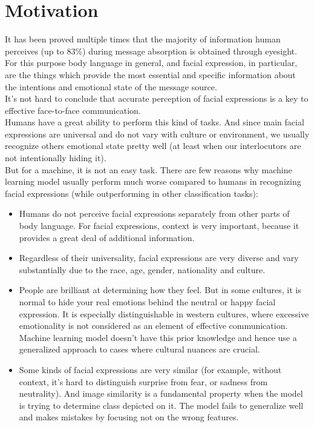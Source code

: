 \section{Motivation}

It has been proved multiple times that the majority of information human perceives (up to $83\%$) during message absorption is obtained through eyesight. For this purpose body language in general, and facial expression, in particular, are the things which provide the most essential and specific information about the intentions and emotional state of the message source.\\

It's not hard to conclude that accurate perception of facial expressions is a key to effective face-to-face communication.\\

Humans have a great ability to perform this kind of tasks. And since main facial expressions are universal and do not vary with culture or environment, we usually recognize others emotional state pretty well (at least when our interlocutors are not intentionally hiding it).\\

But for a machine, it is not an easy task. There are few reasons why machine learning model usually perform much worse compared to humans in recognizing facial expressions (while outperforming in other classification tasks):
\begin{itemize}
    \item 
    Humans do not perceive facial expressions separately from other parts of body language. For facial expressions, context is very important, because it provides a great deal of additional information.
    \item
    Regardless of their universality, facial expressions are very diverse and vary substantially due to the race, age, gender, nationality and culture.
    \item 
    People are brilliant at determining how they feel. But in some cultures, it is normal to hide your real emotions behind the neutral or happy facial expression. It is especially distinguishable in western cultures, where excessive emotionality is not considered as an element of effective communication. Machine learning model doesn't have this prior knowledge and hence use a generalized approach to cases where cultural nuances are crucial.
    \item 
    Some kinds of facial expressions are very similar (for example, without context, it's hard to distinguish surprise from fear, or sadness from neutrality). And image similarity is a fundamental property when the model is trying to determine class depicted on it. The model fails to generalize well and makes mistakes by focusing not on the wrong features.
\end{itemize}

